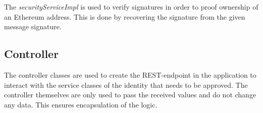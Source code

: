 The \textit{securityServiceImpl} is used to verify signatures in order to proof ownership of an Ethereum address. This is done by recovering the signature from the given message signature. 

\subsection{Controller}\label{sec:controller}
The controller classes are used to create the REST-endpoint in the application to interact with the service classes of the identity that needs to be approved. The controller themselves are only used to pass the received values and do not change any data. This ensures encapsulation of the logic.
